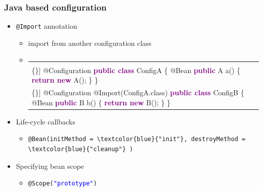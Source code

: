 \documentclass[10pt,xcolor=pdflatex, table]{beamer}
\begin{document}
\begin{frame}[fragile]\frametitle{Java based configuration}
	\begin{itemize}
		\item \texttt{@Import} annotation
        \begin{itemize}
        	\item import from another configuration class
            \item[]
                \begin{tabular}{p{4cm} p{4cm}}
                \begin{Verbatim}[fontsize=\footnotesize, commandchars=\\\{\}]
@Configuration
\textcolor{purple}{\textbf{public class}} ConfigA \{
    @Bean
    \textcolor{purple}{\textbf{public}} A a() \{
        \textcolor{purple}{\textbf{return new}} A();
    \}
\}
				\end{Verbatim}
                &
				\begin{Verbatim}[fontsize=\footnotesize, commandchars=\\\{\}]
@Configuration
@Import(ConfigA.class)
\textcolor{purple}{\textbf{public class}} ConfigB \{
    @Bean
    \textcolor{purple}{\textbf{public}} B b() \{
        \textcolor{purple}{\textbf{return new}} B();
    \}
\}
				\end{Verbatim}
                \end{tabular}
        \end{itemize}
		\item Life-cycle callbacks
        \begin{itemize}
        	\item
            	\begin{Verbatim}[fontsize=\footnotesize, commandchars=\\\{\}]
@Bean(initMethod = \textcolor{blue}{"init"}, destroyMethod = \textcolor{blue}{"cleanup"} )
                \end{Verbatim}
        \end{itemize}
		\item Specifying bean scope
        \begin{itemize}
        	\item \texttt{@Scope(}\textcolor{blue}{\texttt{"prototype"}}\verb')'
        \end{itemize}
	\end{itemize}
\end{frame}
\end{document}

